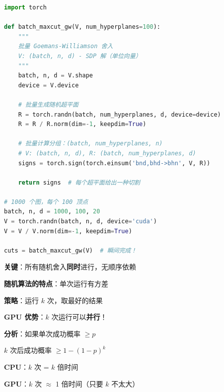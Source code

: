 \documentclass[12pt, a4paper]{ctexart}
\begin{document}
\begin{blackboard}

\begin{lstlisting}[language=Python]
import torch

def batch_maxcut_gw(V, num_hyperplanes=100):
    """
    批量 Goemans-Williamson 舍入
    V: (batch, n, d) - SDP 解（单位向量）
    """
    batch, n, d = V.shape
    device = V.device
    
    # 批量生成随机超平面
    R = torch.randn(batch, num_hyperplanes, d, device=device)
    R = R / R.norm(dim=-1, keepdim=True)
    
    # 批量计算分组：(batch, num_hyperplanes, n)
    # V: (batch, n, d), R: (batch, num_hyperplanes, d)
    signs = torch.sign(torch.einsum('bnd,bhd->bhn', V, R))
    
    return signs  # 每个超平面给出一种切割

# 1000 个图，每个 100 顶点
batch, n, d = 1000, 100, 20
V = torch.randn(batch, n, d, device='cuda')
V = V / V.norm(dim=-1, keepdim=True)

cuts = batch_maxcut_gw(V)  # 瞬间完成！
\end{lstlisting}

\textbf{关键}：所有随机舍入\textbf{同时}进行，无顺序依赖

\end{blackboard}

\begin{blackboard}[多次采样取最好]

\textbf{随机算法的特点}：单次运行有方差

\textbf{策略}：运行 $k$ 次，取最好的结果

\textbf{GPU 优势}：$k$ 次运行可以\textbf{并行}！

\textbf{分析}：如果单次成功概率 $\geq p$

$k$ 次后成功概率 $\geq 1 - (1-p)^k$

\begin{center}
\end{center}

\textbf{CPU}：$k$ 次 = $k$ 倍时间

\textbf{GPU}：$k$ 次 $\approx$ 1 倍时间（只要 $k$ 不太大）

\end{blackboard}
\end{document}
